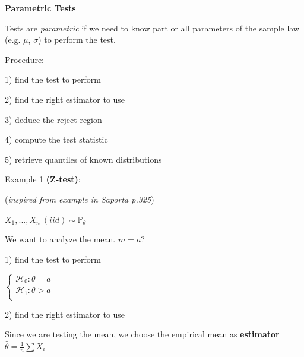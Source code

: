 {\fontsize{12pt}{22pt} \textbf{Parametric Tests}\par}

\vspace{5mm}

Tests are \textit{parametric} if we need to know part or all parameters of the sample law (e.g. $\mu$, $\sigma$) to perform the test.

\vspace{5mm}

Procedure:

1) find the test to perform

2) find the right estimator to use

3) deduce the reject region

4) compute the test statistic

5) retrieve quantiles of known distributions

\vspace{5mm}

Example 1 \textbf{(Z-test)}: 

\vspace{5mm}

(\textit{inspired from example in Saporta p.325})

\vspace{5mm}

$X_1,...,X_n~(iid)\sim \mathbb{P_\theta}$

\vspace{5mm}

We want to analyze the mean. $m=a$?

\vspace{5mm}

1) find the test to perform

\vspace{5mm}

$
\left\{
    \begin{array}{ll}
        \mathcal{H}_0: \theta=a \\
        \mathcal{H}_1: \theta>a \\
    \end{array}
\right.
$

\vspace{5mm}

2) find the right estimator to use

\vspace{5mm}

Since we are testing the mean, we choose the empirical mean as \textbf{estimator} $\widehat{\theta}=\frac{1}{n}\sum{X_i}$

